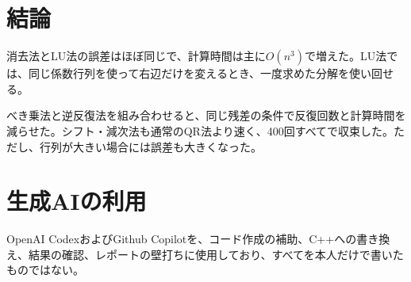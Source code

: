 \documentclass[a4paper,11pt]{article}
\begin{document}
\section{結論}
消去法とLU法の誤差はほぼ同じで、計算時間は主に$O(n^3)$で増えた。LU法では、同じ係数行列を使って右辺だけを変えるとき、一度求めた分解を使い回せる。

べき乗法と逆反復法を組み合わせると、同じ残差の条件で反復回数と計算時間を減らせた。シフト・減次法も通常のQR法より速く、400回すべてで収束した。ただし、行列が大きい場合には誤差も大きくなった。

\section{生成AIの利用}
OpenAI CodexおよびGithub Copilotを、コード作成の補助、C++への書き換え、結果の確認、レポートの壁打ちに使用しており、すべてを本人だけで書いたものではない。
\end{document}
